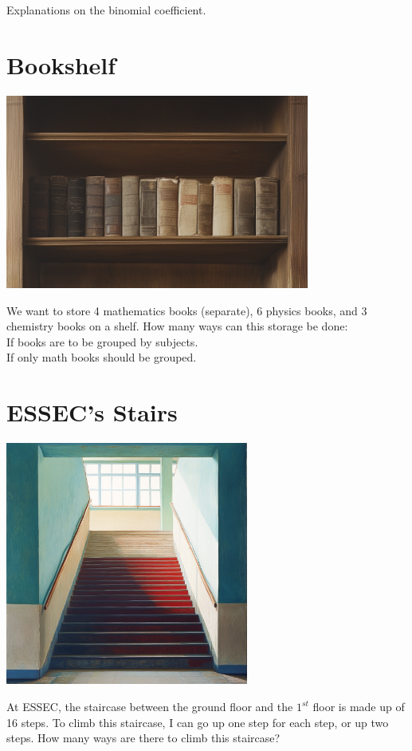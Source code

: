 \documentclass[]{article}
\begin{document}
	Explanations on the binomial coefficient.
	
	\newpage
	\section{Bookshelf}
	\begin{center}
		\includegraphics[width=10cm]{bookshelf.png}
	\end{center}
	We want to store 4 mathematics books (separate), 6 physics books, and 3 chemistry books on a shelf.
	How many ways can this storage be done:\\
	If books are to be grouped by subjects.\\
	If only math books should be grouped.
	
	\newpage
	\section{ESSEC's Stairs}
	\begin{center}
		\includegraphics[height=8cm]{stairs.png}
	\end{center}
	At ESSEC, the staircase between the ground floor and the $1^{st}$ floor is made up of 16 steps.
	To climb this staircase, I can go up one step for each step, or up two steps. How many ways are there to climb this staircase?
	
	
	
	
\end{document}
